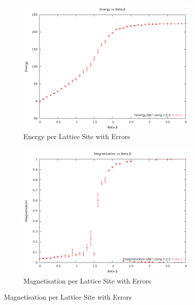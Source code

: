 \documentclass[12pt,a4paper,notitlepage,twoside]{article}
\begin{document}
\begin{figure}[H]
\centering
	\begin{subfigure}[b]{0.45\textwidth}
		\includegraphics[width=\textwidth]{q4d20/energy.png}	
		\caption{Energy per Lattice Site with Errors}
	\end{subfigure}
	\begin{subfigure}[b]{0.45\textwidth}
		\includegraphics[width=\textwidth]{q4d20/magnetisation.png}
		\caption{Magnetisation per Lattice Site with Errors}
	\end{subfigure}
\end{figure}
\end{document}
